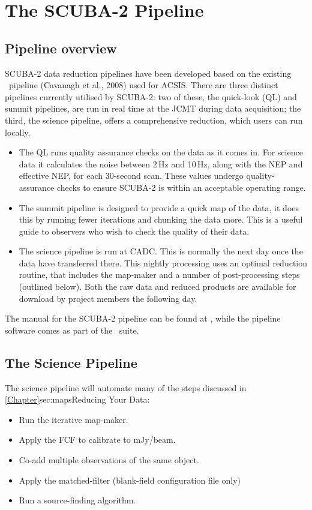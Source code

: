 \documentclass[11pt,oneside,chapters]{starlink}
\begin{document}
\chapter{The SCUBA-2 Pipeline}
\label{sec:pipe}

\section{Pipeline overview}

SCUBA-2 data reduction pipelines have been developed based on the
existing \oracdr\ pipeline (Cavanagh et al., 2008\cite{oracdr}) used
for ACSIS. There are three distinct pipelines currently utilised by
SCUBA-2: two of these, the quick-look (QL) and summit pipelines, are
run in real time at the JCMT during data acquisition; the third, the science
pipeline, offers a comprehensive reduction, which users can run locally.

\begin{itemize}
\item The QL runs quality assurance checks on the data as it comes in.
For science data it calculates the noise between 2\,Hz and 10\,Hz,
along with the NEP and effective NEP, for each 30-second scan. These
values undergo quality-assurance checks to ensure SCUBA-2 is within
an acceptable operating range.
\item The summit pipeline is designed to provide a quick map of the
data, it does this by running fewer iterations and chunking the data
more. This is a useful guide to observers who wish to check the
quality of their data.
\item The science pipeline is run at CADC. This is normally the next
day once the data have transferred there.  This nightly processing
uses an optimal reduction routine, that includes the map-maker and a
number of post-processing steps (outlined below). Both the raw data
and reduced products are available for download by project members the
following day.
\end{itemize}

The manual for the SCUBA-2 pipeline can be found at \pipelinesun,
while the pipeline software comes as part of the \starlink\ suite.


\section{The Science Pipeline}

The science pipeline will automate many of the steps discussed in
\cref{Chapter}{sec:maps}{Reducing Your Data}:
\vspace{-0.3cm}
\begin{itemize}\itemsep-0.3em
\item Run the iterative map-maker.
\item Apply the FCF to calibrate to mJy/beam.
\item Co-add multiple observations of the same object.
\item Apply the matched-filter (blank-field configuration file only)
\item Run a source-finding algorithm.
\end{itemize}
\end{document}
